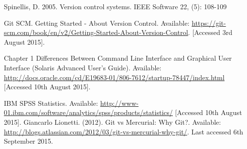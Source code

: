 \documentclass[a4paper,oneside]{bth} %
\begin{document}
\begin{thebibliography}{1}
			Spinellis, D. 2005. Version control systems. IEEE Software 22, (5): 108-109	
			
			Git SCM. Getting Started - About Version Control. Available: \url{https://git-scm.com/book/en/v2/Getting-Started-About-Version-Control}. [Accessed 3rd August 2015].
			
			Chapter 1 Differences Between Command Line Interface and Graphical User Interface (Solaris Advanced User's Guide). Available: \url{http://docs.oracle.com/cd/E19683-01/806-7612/startup-78447/index.html} [Accessed 10th August 2015].
			
			IBM SPSS Statistics. Available: \url{http://www-01.ibm.com/software/analytics/spss/products/statistics/} [Accessed 10th August 2015].
			Giancarlo Lionetti. (2012). Git vs Mercurial: Why Git?.
			Available: \url{http://blogs.atlassian.com/2012/03/git-vs-mercurial-why-git/}.
			Last accessed 6th September 2015.
			
		\end{thebibliography}
		
		\appendix
\end{document}
